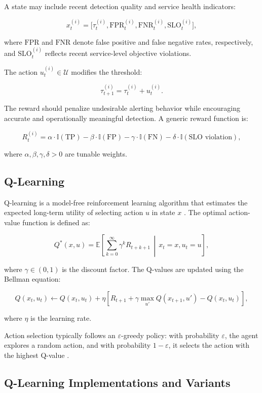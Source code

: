 A state may include recent detection quality and service health indicators:

\[
x_t^{(i)} =
\big[
\tau_t^{(i)},
\text{FPR}_t^{(i)},
\text{FNR}_t^{(i)},
\text{SLO}_t^{(i)}
\big],
\]

where $\text{FPR}$ and $\text{FNR}$ denote false positive and false negative 
rates, respectively, and $\text{SLO}_t^{(i)}$ reflects recent service-level 
objective violations.

The action $u_t^{(i)} \in \mathcal{U}$ modifies the threshold:

\[
\tau_{t+1}^{(i)} = \tau_t^{(i)} + u_t^{(i)}.
\]

The reward should penalize undesirable alerting behavior while encouraging 
accurate and operationally meaningful detection. A generic reward function is:

\[
R_t^{(i)} =
\alpha \cdot \mathbb{I}(\text{TP})
- \beta \cdot \mathbb{I}(\text{FP})
- \gamma \cdot \mathbb{I}(\text{FN})
- \delta \cdot \mathbb{I}(\text{SLO violation}),
\]

where $\alpha, \beta, \gamma, \delta > 0$ are tunable weights.

\subsection{Q-Learning}
\label{subsec:threshold_qlearning}

Q-learning is a model-free reinforcement learning algorithm that estimates the 
expected long-term utility of selecting action $u$ in state $x$ \cite{turn0search6}. 
The optimal action-value function is defined as:

\[
Q^*(x,u) = \mathbb{E}\left[\sum_{k=0}^{\infty} \gamma^k R_{t+k+1} \,\middle|\, x_t=x, u_t=u \right],
\]

where $\gamma \in (0,1)$ is the discount factor. The Q-values are updated using 
the Bellman equation:

\[
Q(x_t,u_t) \leftarrow Q(x_t,u_t) +
\eta \left[
R_{t+1} + \gamma \max_{u'} Q(x_{t+1},u') - Q(x_t,u_t)
\right],
\]

where $\eta$ is the learning rate.

Action selection typically follows an $\varepsilon$-greedy policy: with 
probability $\varepsilon$, the agent explores a random action, and with 
probability $1-\varepsilon$, it selects the action with the highest Q-value 
\cite{turn0search6}.

\subsection{Q-Learning Implementations and Variants}
\label{subsec:threshold_qlearning_variants}

